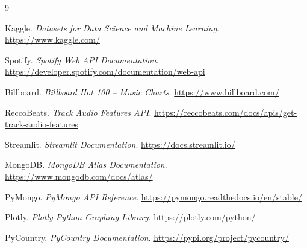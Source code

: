\documentclass{../hcmut-report}
\begin{document}
\begin{thebibliography}{9}

Kaggle. \textit{Datasets for Data Science and Machine Learning}.  
\url{https://www.kaggle.com/}

Spotify. \textit{Spotify Web API Documentation}.  
\url{https://developer.spotify.com/documentation/web-api}

Billboard. \textit{Billboard Hot 100 – Music Charts}.  
\url{https://www.billboard.com/}

ReccoBeats. \textit{Track Audio Features API}.  
\url{https://reccobeats.com/docs/apis/get-track-audio-features}

Streamlit. \textit{Streamlit Documentation}.  
\url{https://docs.streamlit.io/}

MongoDB. \textit{MongoDB Atlas Documentation}.  
\url{https://www.mongodb.com/docs/atlas/}

PyMongo. \textit{PyMongo API Reference}.  
\url{https://pymongo.readthedocs.io/en/stable/}

Plotly. \textit{Plotly Python Graphing Library}.  
\url{https://plotly.com/python/}

PyCountry. \textit{PyCountry Documentation}.  
\url{https://pypi.org/project/pycountry/}


\end{thebibliography}
\end{document}
